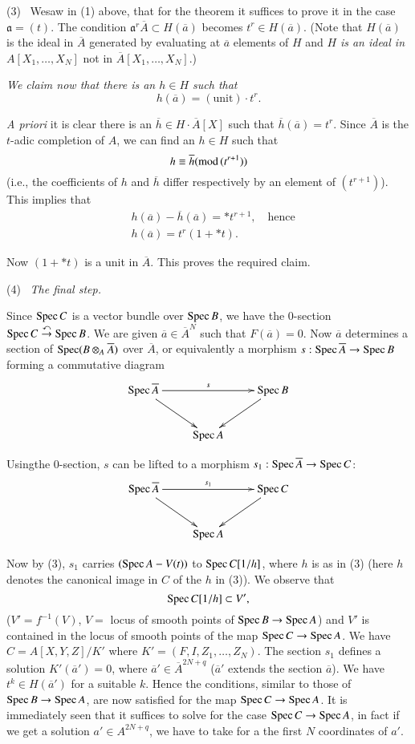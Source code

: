 \smallskip
(3)~ We\pageoriginale saw in (1) above, that for the theorem it
suffices to prove it in the case $\mathfrak{a}=(t)$. The condition
$\mathfrak{a}^{r}\overline{A}\subset H(\overline{a})$ becomes
$t^{r}\in H(\overline{a})$. (Note that $H(\overline{a})$ is the ideal
in $\overline{A}$ generated by evaluating at $\overline{a}$ elements
of $H$ and $H$ {\em is an ideal in} $A[X_{1},\ldots,X_{N}]$ not in
$\overline{A}[X_{1},\ldots,X_{N}]$.)

{\em We claim now that there is an $h\in H$ such that}
$$
h(\overline{a})=(\text{unit}) \cdot t^{r}.
$$

{\em A priori} it is clear there is an $\overline{h}\in H\cdot
\overline{A}[X]$ such that $\overline{h}(\overline{a})=t^{r}$. Since
$\overline{A}$ is the $t$-adic completion of $A$, we can find an $h\in
H$ such that
$$
h\equiv \overline{h}(\text{mod\,}(t^{r+1}))
$$
(i.e., the coefficients of $h$ and $\overline{h}$ differ respectively
by an element of $(t^{r+1})$). This implies that
\begin{align*}
& h(\overline{a})-\overline{h}(\overline{a})=\ast
  t^{r+1},\quad\text{hence}\\
& h(\overline{a})=t^{r}(1+*t).
\end{align*}

Now $(1+*t)$ is a unit in $\overline{A}$. This proves the required
claim.

\smallskip
(4)~ {\em The final step.}

Since $\operatorname{Spec} C$ is a vector bundle over $\operatorname{Spec} B$, we have the
$0$-section $\operatorname{Spec} C \overset{\curvearrowleft}{\to}\operatorname{Spec} B$. We are
given $\overline{a}\in\overline{A}^{N}$ such that
$F(\overline{a})=0$. Now $\overline{a}$ determines a section of $\operatorname{Spec}
(B\otimes_{A}\overline{A})$ over $\overline{A}$, or equivalently a
morphism $s:\operatorname{Spec} \overline{A}\to \operatorname{Spec} B$ forming a commutative
diagram
\[
\xymatrix{
\Spec \overline{A}\ar[rr]^-{s}\ar[dr] & & \Spec B\ar[dl]\\
 & \Spec A &
}
\]

Using\pageoriginale the $0$-section, $s$ can be lifted to a morphism
$s_{1}:\operatorname{Spec} \overline{A}\to \operatorname{Spec} C$:
\[
\xymatrix{
\Spec \overline{A}\ar[rr]^-{s_{1}}\ar[dr] & & \Spec C\ar[dl]\\
 & \Spec A &
}
\]

Now by (3), $s_{1}$ carries $(\operatorname{Spec} A-V(t))$ to $\operatorname{Spec} C[1/h]$, where
$h$ is as in (3) (here $h$ denotes the canonical image in $C$ of the
$h$ in (3)). We observe that
$$
\operatorname{Spec} C[1/h]\subset V',
$$
($V'=f^{-1}(V)$, $V=$ locus of smooth points of $\operatorname{Spec} B\to \operatorname{Spec} A$)
and $V'$ is contained in the locus of smooth points of the map $\operatorname{Spec}
C\to \operatorname{Spec} A$. We have $C=A[X,Y,Z]/K'$ where
$K'=(F,I,Z_{1},\ldots,Z_{N})$. The section $s_{1}$ defines a solution
$K'(\overline{a}')=0$, where $\overline{a}'\in \overline{A}^{2N+q}$
($\overline{a}'$ extends the section $\overline{a}$). We have
$t^{k}\in H(\overline{a}')$ for a suitable $k$. Hence the conditions,
similar to those of $\operatorname{Spec} B\to \operatorname{Spec} A$, are now satisfied for the
map $\operatorname{Spec} C\to \operatorname{Spec} A$. It is immediately seen that it suffices to
solve for the case $\operatorname{Spec} C\to \operatorname{Spec} A$, in fact if we get a solution
$a'\in A^{2N+q}$, we have to take for a the first $N$ coordinates of
$a'$.


